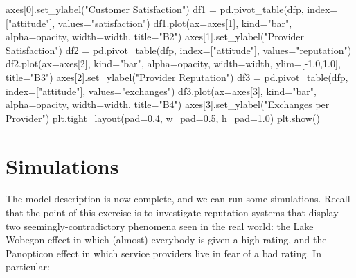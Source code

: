 \documentclass[
  letterpaper,
  DIV=11,
  numbers=noendperiod]{scrartcl}
\newenvironment{Shaded}{\begin{snugshade}}{\end{snugshade}}
\newcommand{\DecValTok}[1]{\textcolor[rgb]{0.68,0.00,0.00}{#1}}
\newcommand{\FloatTok}[1]{\textcolor[rgb]{0.68,0.00,0.00}{#1}}
\newcommand{\NormalTok}[1]{\textcolor[rgb]{0.00,0.23,0.31}{#1}}
\newcommand{\OperatorTok}[1]{\textcolor[rgb]{0.37,0.37,0.37}{#1}}
\newcommand{\StringTok}[1]{\textcolor[rgb]{0.13,0.47,0.30}{#1}}
\begin{document}
\begin{Shaded}
\begin{Highlighting}[]
\NormalTok{    axes[}\DecValTok{0}\NormalTok{].set\_ylabel(}\StringTok{"Customer Satisfaction"}\NormalTok{)}
\NormalTok{    df1 }\OperatorTok{=}\NormalTok{ pd.pivot\_table(dfp, index}\OperatorTok{=}\NormalTok{[}\StringTok{"attitude"}\NormalTok{], values}\OperatorTok{=}\StringTok{"satisfaction"}\NormalTok{)}
\NormalTok{    df1.plot(ax}\OperatorTok{=}\NormalTok{axes[}\DecValTok{1}\NormalTok{], kind}\OperatorTok{=}\StringTok{"bar"}\NormalTok{, alpha}\OperatorTok{=}\NormalTok{opacity, width}\OperatorTok{=}\NormalTok{width, title}\OperatorTok{=}\StringTok{"B2"}\NormalTok{)}
\NormalTok{    axes[}\DecValTok{1}\NormalTok{].set\_ylabel(}\StringTok{"Provider Satisfaction"}\NormalTok{)}
\NormalTok{    df2 }\OperatorTok{=}\NormalTok{ pd.pivot\_table(dfp, index}\OperatorTok{=}\NormalTok{[}\StringTok{"attitude"}\NormalTok{], values}\OperatorTok{=}\StringTok{"reputation"}\NormalTok{)}
\NormalTok{    df2.plot(ax}\OperatorTok{=}\NormalTok{axes[}\DecValTok{2}\NormalTok{], kind}\OperatorTok{=}\StringTok{"bar"}\NormalTok{, alpha}\OperatorTok{=}\NormalTok{opacity, width}\OperatorTok{=}\NormalTok{width, ylim}\OperatorTok{=}\NormalTok{[}\OperatorTok{{-}}\FloatTok{1.0}\NormalTok{,}\FloatTok{1.0}\NormalTok{], title}\OperatorTok{=}\StringTok{"B3"}\NormalTok{)}
\NormalTok{    axes[}\DecValTok{2}\NormalTok{].set\_ylabel(}\StringTok{"Provider Reputation"}\NormalTok{)}
\NormalTok{    df3 }\OperatorTok{=}\NormalTok{ pd.pivot\_table(dfp, index}\OperatorTok{=}\NormalTok{[}\StringTok{"attitude"}\NormalTok{], values}\OperatorTok{=}\StringTok{"exchanges"}\NormalTok{)}
\NormalTok{    df3.plot(ax}\OperatorTok{=}\NormalTok{axes[}\DecValTok{3}\NormalTok{], kind}\OperatorTok{=}\StringTok{"bar"}\NormalTok{, alpha}\OperatorTok{=}\NormalTok{opacity, width}\OperatorTok{=}\NormalTok{width, title}\OperatorTok{=}\StringTok{"B4"}\NormalTok{)}
\NormalTok{    axes[}\DecValTok{3}\NormalTok{].set\_ylabel(}\StringTok{"Exchanges per Provider"}\NormalTok{)}
\NormalTok{    plt.tight\_layout(pad}\OperatorTok{=}\FloatTok{0.4}\NormalTok{, w\_pad}\OperatorTok{=}\FloatTok{0.5}\NormalTok{, h\_pad}\OperatorTok{=}\FloatTok{1.0}\NormalTok{)}
\NormalTok{    plt.show()      }
\end{Highlighting}
\end{Shaded}

\hypertarget{simulations}{%
\section{Simulations}\label{simulations}}

The model description is now complete, and we can run some simulations.
Recall that the point of this exercise is to investigate reputation
systems that display two seemingly-contradictory phenomena seen in the
real world: the Lake Wobegon effect in which (almost) everybody is given
a high rating, and the Panopticon effect in which service providers live
in fear of a bad rating. In particular:
\end{document}
